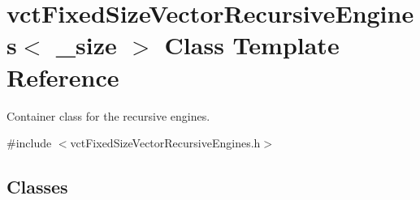 \hypertarget{classvct_fixed_size_vector_recursive_engines}{}\section{vct\+Fixed\+Size\+Vector\+Recursive\+Engines$<$ \+\_\+size $>$ Class Template Reference}
\label{classvct_fixed_size_vector_recursive_engines}


Container class for the recursive engines.  




{\ttfamily \#include $<$vct\+Fixed\+Size\+Vector\+Recursive\+Engines.\+h$>$}

\subsection*{Classes}
